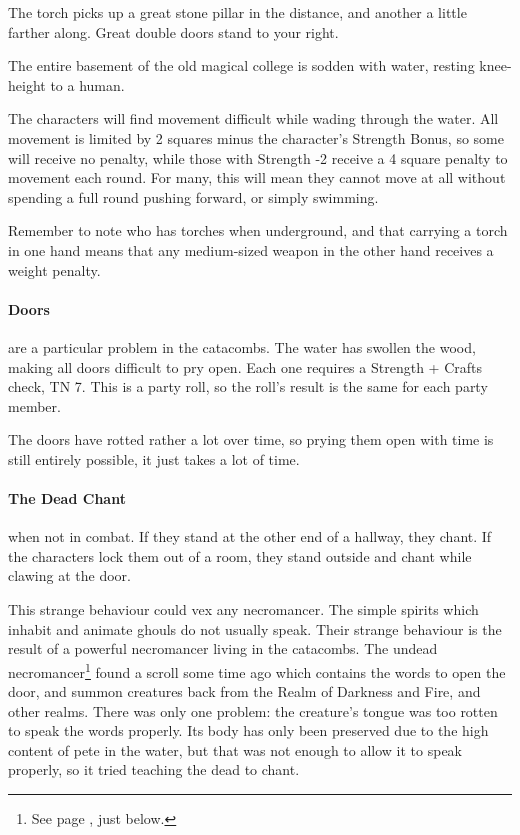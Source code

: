 \begin{multicols}{2}
\begin{boxtext}
	The torch picks up a great stone pillar in the distance, and another a little farther along.  Great double doors stand to your right.

\end{boxtext}



The entire basement of the old magical college is sodden with water, resting knee-height to a human.

The characters will find movement difficult while wading through the water.  All movement is limited by 2 squares minus the character's Strength Bonus, so some will receive no penalty, while those with Strength -2 receive a 4 square penalty to movement each round.  For many, this will mean they cannot move at all without spending a full round pushing forward, or simply swimming.

Remember to note who has torches when underground, and that carrying a torch in one hand means that any medium-sized weapon in the other hand receives a weight penalty.

\paragraph{Doors} are a particular problem in the catacombs.  The water has swollen the wood, making all doors difficult to pry open.  Each one requires a Strength + Crafts check, TN 7.  This is a party roll, so the roll's result is the same for each party member.


The doors have rotted rather a lot over time, so prying them open with time is still entirely possible, it just takes a lot of time.

\paragraph{The Dead Chant} when not in combat.  If they stand at the other end of a hallway, they chant.  If the characters lock them out of a room, they stand outside and chant while clawing at the door.

This strange behaviour could vex any necromancer.  The simple spirits which inhabit and animate ghouls do not usually speak.  Their strange behaviour is the result of a powerful necromancer living in the catacombs.  The undead necromancer\footnote{See page \pageref{undead_ogre}, just below.} found a scroll some time ago which contains the words to open the door, and summon creatures back from the Realm of Darkness and Fire, and other realms.  There was only one problem: the creature's tongue was too rotten to speak the words properly.  Its body has only been preserved due to the high content of pete in the water, but that was not enough to allow it to speak properly, so it tried teaching the dead to chant.


\end{multicols}
